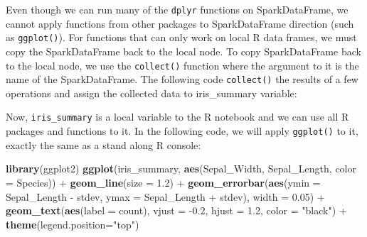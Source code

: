 \documentclass[]{book}
\newenvironment{Shaded}{\begin{snugshade}}{\end{snugshade}}
\newcommand{\KeywordTok}[1]{\textcolor[rgb]{0.13,0.29,0.53}{\textbf{{#1}}}}
\newcommand{\DataTypeTok}[1]{\textcolor[rgb]{0.13,0.29,0.53}{{#1}}}
\newcommand{\DecValTok}[1]{\textcolor[rgb]{0.00,0.00,0.81}{{#1}}}
\newcommand{\FloatTok}[1]{\textcolor[rgb]{0.00,0.00,0.81}{{#1}}}
\newcommand{\StringTok}[1]{\textcolor[rgb]{0.31,0.60,0.02}{{#1}}}
\newcommand{\NormalTok}[1]{{#1}}
\theoremstyle{definition}
\theoremstyle{definition}
\theoremstyle{remark}
\begin{document}
Even though we can run many of the \texttt{dplyr} functions on
SparkDataFrame, we cannot apply functions from other packages to
SparkDataFrame direction (such as \texttt{ggplot()}). For functions that
can only work on local R data frames, we must copy the SparkDataFrame
back to the local node. To copy SparkDataFrame back to the local node,
we use the \texttt{collect()} function where the argument to it is the
name of the SparkDataFrame. The following code \texttt{collect()} the
results of a few operations and assign the collected data to
iris\_summary variable:

\begin{Shaded}
\end{Shaded}

Now, \texttt{iris\_summary} is a local variable to the R notebook and we
can use all R packages and functions to it. In the following code, we
will apply \texttt{ggplot()} to it, exactly the same as a stand along R
console:

\begin{Shaded}
\begin{Highlighting}[]
\KeywordTok{library}\NormalTok{(ggplot2)}
\KeywordTok{ggplot}\NormalTok{(iris_summary, }\KeywordTok{aes}\NormalTok{(Sepal_Width, Sepal_Length, }\DataTypeTok{color =} \NormalTok{Species)) +}\StringTok{ }
\StringTok{  }\KeywordTok{geom_line}\NormalTok{(}\DataTypeTok{size =} \FloatTok{1.2}\NormalTok{) +}
\StringTok{  }\KeywordTok{geom_errorbar}\NormalTok{(}\KeywordTok{aes}\NormalTok{(}\DataTypeTok{ymin =} \NormalTok{Sepal_Length -}\StringTok{ }\NormalTok{stdev, }\DataTypeTok{ymax =} \NormalTok{Sepal_Length +}\StringTok{ }\NormalTok{stdev), }\DataTypeTok{width =} \FloatTok{0.05}\NormalTok{) +}
\StringTok{  }\KeywordTok{geom_text}\NormalTok{(}\KeywordTok{aes}\NormalTok{(}\DataTypeTok{label =} \NormalTok{count), }\DataTypeTok{vjust =} \NormalTok{-}\FloatTok{0.2}\NormalTok{, }\DataTypeTok{hjust =} \FloatTok{1.2}\NormalTok{, }\DataTypeTok{color =} \StringTok{"black"}\NormalTok{) +}
\StringTok{  }\KeywordTok{theme}\NormalTok{(}\DataTypeTok{legend.position=}\StringTok{"top"}\NormalTok{)}
\end{Highlighting}
\end{Shaded}
\end{document}
